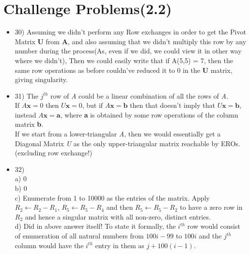 \documentclass{article}
\begin{document}
\section{Challenge Problems(2.2)}
\begin{itemize}
  \item 30) Assuming we didn't perform any Row exchanges in order to get the Pivot Matrix \textbf{U} from \textbf{A}, and also assuming that we didn't multiply this row by any number during the process(As, even if we did, we could view it in other way where we didn't), Then we could easily write that if A(5,5)  = 7, then the same row operations as before couldn've reduced it to 0 in the \textbf{U} matrix, giving singularity.
  \item 31) The $j^{th}$ row of \textit{A} could be a linear combination of all the rows of \textit{A}. \\
  If $A\mathbf{x}=0$ then $U\mathbf{x}=0$, but if $A\mathbf{x}=\mathbf{b}$ then that doesn't imply that $U\mathbf{x}=\mathbf{b}$, instead $A\mathbf{x}=\mathbf{a}$, where \textbf{a} is obtained by some row operations of the column matrix \textbf{b}. \\
  If we start from a lower-triangular \textit{A}, then we would essentially get a Diagonal Matrix \textit{U} as the only upper-triangular matrix reachable by EROs.(excluding row exchange!)
  \item 32)\\ a) 0 \\ b) 0 \\ c) Enumerate from 1 to 10000 as the entries of the matrix. Apply $R_2 \leftarrow R_2 - R_1$, $R_5 \leftarrow R_5 - R_4$ and then $R_5 \leftarrow R_5 - R_2$ to have a zero row in $R_2$ and hence a singular matrix with all non-zero, distinct entries. \\ d) Did in above answer itself! To state it formally, the $i^{th}$ row would consist of enumeration of all natural numbers from $100i-99$ to $100i$ and the $j^{th}$ column would have the $i^{th}$ entry in them as $j+100(i-1)$.
\end{itemize}
\end{document}
